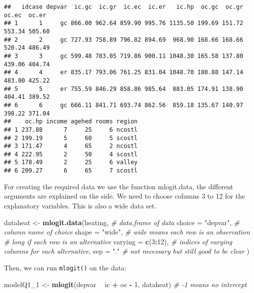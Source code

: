 \documentclass[
]{article}
\newenvironment{Shaded}{\begin{snugshade}}{\end{snugshade}}
\newcommand{\CommentTok}[1]{\textcolor[rgb]{0.56,0.35,0.01}{\textit{#1}}}
\newcommand{\DataTypeTok}[1]{\textcolor[rgb]{0.13,0.29,0.53}{#1}}
\newcommand{\DecValTok}[1]{\textcolor[rgb]{0.00,0.00,0.81}{#1}}
\newcommand{\KeywordTok}[1]{\textcolor[rgb]{0.13,0.29,0.53}{\textbf{#1}}}
\newcommand{\NormalTok}[1]{#1}
\newcommand{\OperatorTok}[1]{\textcolor[rgb]{0.81,0.36,0.00}{\textbf{#1}}}
\newcommand{\StringTok}[1]{\textcolor[rgb]{0.31,0.60,0.02}{#1}}
\begin{document}
\begin{verbatim}
##   idcase depvar  ic.gc  ic.gr  ic.ec  ic.er   ic.hp  oc.gc  oc.gr  oc.ec  oc.er
## 1      1     gc 866.00 962.64 859.90 995.76 1135.50 199.69 151.72 553.34 505.60
## 2      2     gc 727.93 758.89 796.82 894.69  968.90 168.66 168.66 520.24 486.49
## 3      3     gc 599.48 783.05 719.86 900.11 1048.30 165.58 137.80 439.06 404.74
## 4      4     er 835.17 793.06 761.25 831.04 1048.70 180.88 147.14 483.00 425.22
## 5      5     er 755.59 846.29 858.86 985.64  883.05 174.91 138.90 404.41 389.52
## 6      6     gc 666.11 841.71 693.74 862.56  859.18 135.67 140.97 398.22 371.04
##    oc.hp income agehed rooms region
## 1 237.88      7     25     6 ncostl
## 2 199.19      5     60     5 scostl
## 3 171.47      4     65     2 ncostl
## 4 222.95      2     50     4 scostl
## 5 178.49      2     25     6 valley
## 6 209.27      6     65     7 scostl
\end{verbatim}

For creating the required data we use the function mlogit.data, the
different arguments are explained on the side. We need to choose columns
3 to 12 for the explanatory variables. This is also a wide data set.

\begin{Shaded}
\begin{Highlighting}[]
\NormalTok{dataheat <-}\StringTok{ }\KeywordTok{mlogit.data}\NormalTok{(heating,  }\CommentTok{# data.frame of data}
                    \DataTypeTok{choice =} \StringTok{"depvar"}\NormalTok{,  }\CommentTok{# column name of choice}
                    \DataTypeTok{shape =} \StringTok{"wide"}\NormalTok{,  }\CommentTok{# wide means each row is an observation}
                                     \CommentTok{# long if each row is an alternative}
                    \DataTypeTok{varying =} \KeywordTok{c}\NormalTok{(}\DecValTok{3}\OperatorTok{:}\DecValTok{12}\NormalTok{), }\CommentTok{# indices of varying columns for each alternative,}
                    \DataTypeTok{sep =} \StringTok{"."}  \CommentTok{# not necessary but still good to be clear}
\NormalTok{                    )}
\end{Highlighting}
\end{Shaded}

Then, we can run \texttt{mlogit()} on the data:

\begin{Shaded}
\begin{Highlighting}[]
\NormalTok{modelQ1_}\DecValTok{1}\NormalTok{ <-}\StringTok{ }\KeywordTok{mlogit}\NormalTok{(depvar }\OperatorTok{~}\StringTok{ }\NormalTok{ic }\OperatorTok{+}\StringTok{ }\NormalTok{oc }\OperatorTok{-}\StringTok{ }\DecValTok{1}\NormalTok{, dataheat)  }\CommentTok{# -1 means no intercept}
\end{Highlighting}
\end{Shaded}
\end{document}
